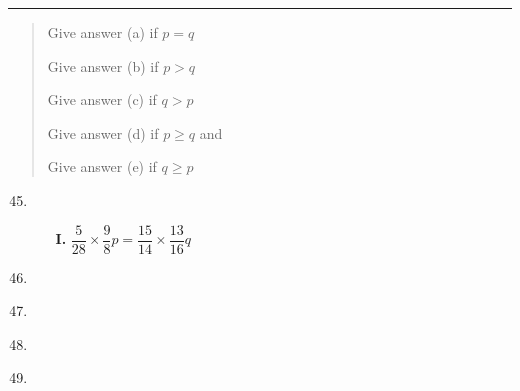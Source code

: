\begin{multicols}{2}
\noindent
\rule{\columnwidth}{1pt}

\begin{quote}
Give answer (a) if $p=q$

Give answer (b) if $p>q$

Give answer (c) if $q>p$

Give answer (d) if $p\geq q$ and

Give answer (e) if $q\geq p$
\end{quote}

\begin{enumerate}[leftmargin=*]
\setcounter{enumi}{44}
\item 
\begin{itemize}
\item[{\bf I.}] $\dfrac{5}{28}\times \dfrac{9}{8}p=\dfrac{15}{14}\times \dfrac{13}{16}q$
\end{itemize}

\item 
\begin{itemize}
\end{itemize}

\item 
\begin{itemize}
\end{itemize}

\item 
\begin{itemize}
\end{itemize}

\item 
\begin{itemize}
\end{itemize}
\end{enumerate}


\end{multicols}
